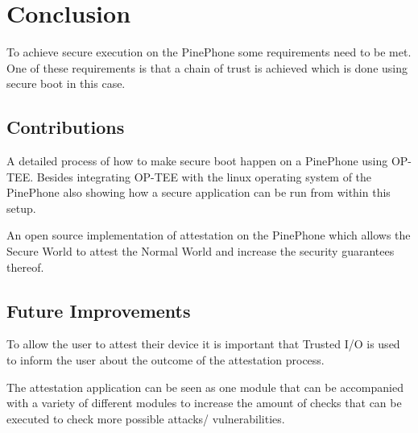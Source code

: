 \documentclass{report}
\begin{document}
\chapter{Conclusion}

To achieve secure execution on the PinePhone some requirements need to be met. One of these requirements is that a chain of trust is achieved which is done using secure boot in this case.

\section{Contributions}

A detailed process of how to make secure boot happen on a PinePhone using OP-TEE. Besides integrating OP-TEE with the linux operating system of the PinePhone also showing how a secure application can be run from within this setup.
\medskip

An open source implementation of attestation on the PinePhone which allows the Secure World to attest the Normal World and increase the security guarantees thereof.

\section{Future Improvements}

To allow the user to attest their device it is important that Trusted I/O is used to inform the user about the outcome of the attestation process.
\medskip

The attestation application can be seen as one module that can be accompanied with a variety of different modules to increase the amount of checks that can be executed to check more possible attacks/ vulnerabilities.
\end{document}
